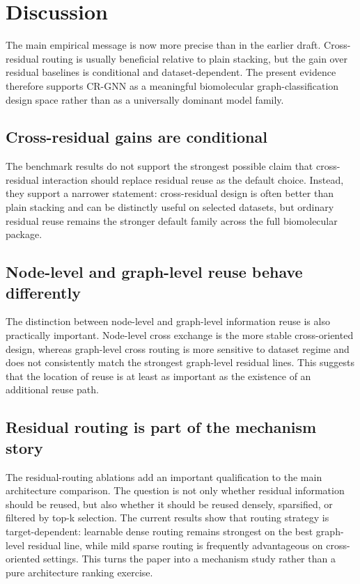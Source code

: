 \section*{Discussion}

The main empirical message is now more precise than in the earlier draft. Cross-residual routing is usually beneficial relative to plain stacking, but the gain over residual baselines is conditional and dataset-dependent. The present evidence therefore supports CR-GNN as a meaningful biomolecular graph-classification design space rather than as a universally dominant model family.

\subsection*{Cross-residual gains are conditional}

The benchmark results do not support the strongest possible claim that cross-residual interaction should replace residual reuse as the default choice. Instead, they support a narrower statement: cross-residual design is often better than plain stacking and can be distinctly useful on selected datasets, but ordinary residual reuse remains the stronger default family across the full biomolecular package.

\subsection*{Node-level and graph-level reuse behave differently}

The distinction between node-level and graph-level information reuse is also practically important. Node-level cross exchange is the more stable cross-oriented design, whereas graph-level cross routing is more sensitive to dataset regime and does not consistently match the strongest graph-level residual lines. This suggests that the location of reuse is at least as important as the existence of an additional reuse path.

\subsection*{Residual routing is part of the mechanism story}

The residual-routing ablations add an important qualification to the main architecture comparison. The question is not only whether residual information should be reused, but also whether it should be reused densely, sparsified, or filtered by top-k selection. The current results show that routing strategy is target-dependent: learnable dense routing remains strongest on the best graph-level residual line, while mild sparse routing is frequently advantageous on cross-oriented settings. This turns the paper into a mechanism study rather than a pure architecture ranking exercise.

